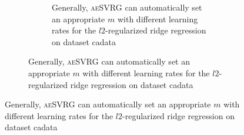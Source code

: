 \documentclass[conference]{IEEEtran}
\begin{document}
\begin{algorithm}[t]
\begin{itemize}
\begin{figure}[ht]
\begin{figure}[ht]
\begin{figure}[ht]
\caption{Generally, \textsc{aeSVRG} can automatically set an appropriate $m$ with different learning rates for the $l2$-regularized ridge regression on dataset cadata}
\label{figure_ridge_cadata}
\end{figure}





\end{figure}
\end{figure}
\end{itemize}
\end{algorithm}
\end{document}
